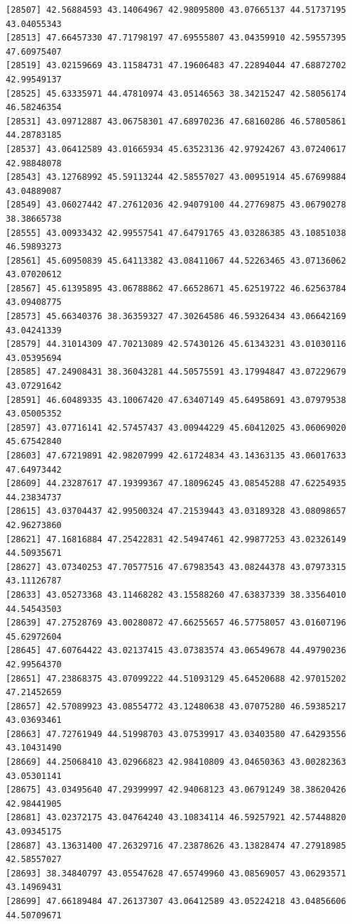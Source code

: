 \documentclass[
  letterpaper,
  DIV=11,
  numbers=noendperiod]{scrartcl}
\begin{document}
\begin{verbatim}
[28507] 42.56884593 43.14064967 42.98095800 43.07665137 44.51737195 43.04055343
[28513] 47.66457330 47.71798197 47.69555807 43.04359910 42.59557395 47.60975407
[28519] 43.02159669 43.11584731 47.19606483 47.22894044 47.68872702 42.99549137
[28525] 45.63335971 44.47810974 43.05146563 38.34215247 42.58056174 46.58246354
[28531] 43.09712887 43.06758301 47.68970236 47.68160286 46.57805861 44.28783185
[28537] 43.06412589 43.01665934 45.63523136 42.97924267 43.07240617 42.98848078
[28543] 43.12768992 45.59113244 42.58557027 43.00951914 45.67699884 43.04889087
[28549] 43.06027442 47.27612036 42.94079100 44.27769875 43.06790278 38.38665738
[28555] 43.00933432 42.99557541 47.64791765 43.03286385 43.10851038 46.59893273
[28561] 45.60950839 45.64113382 43.08411067 44.52263465 43.07136062 43.07020612
[28567] 45.61395895 43.06788862 47.66528671 45.62519722 46.62563784 43.09408775
[28573] 45.66340376 38.36359327 47.30264586 46.59326434 43.06642169 43.04241339
[28579] 44.31014309 47.70213089 42.57430126 45.61343231 43.01030116 43.05395694
[28585] 47.24908431 38.36043281 44.50575591 43.17994847 43.07229679 43.07291642
[28591] 46.60489335 43.10067420 47.63407149 45.64958691 43.07979538 43.05005352
[28597] 43.07716141 42.57457437 43.00944229 45.60412025 43.06069020 45.67542840
[28603] 47.67219891 42.98207999 42.61724834 43.14363135 43.06017633 47.64973442
[28609] 44.23287617 47.19399367 47.18096245 43.08545288 47.62254935 44.23834737
[28615] 43.03704437 42.99500324 47.21539443 43.03189328 43.08098657 42.96273860
[28621] 47.16816884 47.25422831 42.54947461 42.99877253 43.02326149 44.50935671
[28627] 43.07340253 47.70577516 47.67983543 43.08244378 43.07973315 43.11126787
[28633] 43.05273368 43.11468282 43.15588260 47.63837339 38.33564010 44.54543503
[28639] 47.27528769 43.00280872 47.66255657 46.57758057 43.01607196 45.62972604
[28645] 47.60764422 43.02137415 43.07383574 43.06549678 44.49790236 42.99564370
[28651] 47.23868375 43.07099222 44.51093129 45.64520688 42.97015202 47.21452659
[28657] 42.57089923 43.08554772 43.12480638 43.07075280 46.59385217 43.03693461
[28663] 47.72761949 44.51998703 43.07539917 43.03403580 47.64293556 43.10431490
[28669] 44.25068410 43.02966823 42.98410809 43.04650363 43.00282363 43.05301141
[28675] 43.03495640 47.29399997 42.94068123 43.06791249 38.38620426 42.98441905
[28681] 43.02372175 43.04764240 43.10834114 46.59257921 42.57448820 43.09345175
[28687] 43.13631400 47.26329716 47.23878626 43.13828474 47.27918985 42.58557027
[28693] 38.34840797 43.05547628 47.65749960 43.08569057 43.06293571 43.14969431
[28699] 47.66189484 47.26137307 43.06412589 43.05224218 43.04856606 44.50709671

\end{verbatim}
\end{document}
